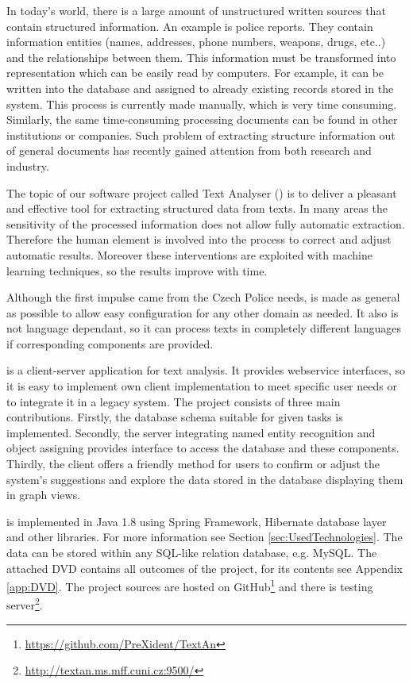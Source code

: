 
In today's world, there is a large amount of unstructured written sources that contain structured information. An example is police reports. They contain
information entities (names, addresses, phone numbers, weapons, drugs, etc..)
and the relationships between them. This information must be transformed into
representation which can be easily read by computers. For example, it can be
written into the database and assigned to already existing records stored in
the system. This process is currently made manually, which is very time 
consuming. Similarly, the same time-consuming processing documents can be found
in other institutions or companies. Such problem of extracting structure
information out of general documents has recently gained attention from both
research and industry.

The topic of our software project called Text Analyser (\textan{}) is to
deliver a pleasant and effective tool for extracting structured data from texts.
In many areas the sensitivity of the processed information does not allow fully
automatic extraction. Therefore the human element is involved into the process
to correct and adjust automatic results. Moreover these interventions are
exploited with machine learning techniques, so the results improve with time.

Although the first impulse came from the Czech Police needs, \textan{} is made
as general as possible to allow easy configuration for any other domain as
needed. It also is not language dependant, so it can process texts in completely
different languages if corresponding components are provided.

\textan{} is a client-server application for text analysis. It provides
webservice interfaces, so it is easy to implement own client implementation to
meet specific user needs or to integrate it in a legacy system. The project
consists of three main contributions. Firstly, the database schema suitable for
given tasks is implemented. Secondly, the server integrating named entity
recognition and object assigning provides interface to access the database and
these components. Thirdly, the client offers a friendly method for users to
confirm or adjust the system's suggestions and explore the data stored in the
database displaying them in graph views.

\textan{} is implemented in Java 1.8 using Spring Framework, Hibernate database
layer and other libraries. For more information see Section
\ref{sec:UsedTechnologies}. The data can be stored within any SQL-like relation
database, e.g. MySQL. The attached DVD contains all outcomes of the project,
for its contents see Appendix \ref{app:DVD}. The project sources are hosted
on GitHub\footnote{\url{https://github.com/PreXident/TextAn}} and there is
testing server\footnote{\url{http://textan.ms.mff.cuni.cz:9500/}}.

